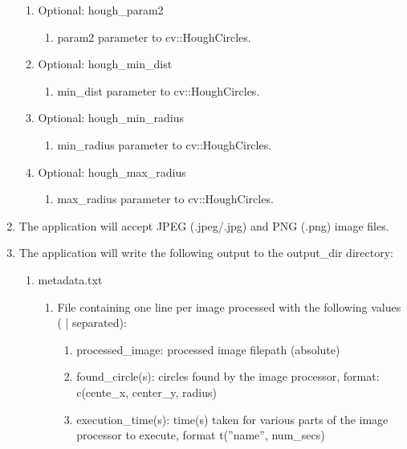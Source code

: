 \documentclass[10pt, onecolumn, draftclsnofoot, letterpaper, compsoc]{IEEEtran}
\begin{document}
\begin{enumerate}
\begin{enumerate}
            \item Optional: hough\_param2
		 		\begin{enumerate}
		 			\item param2 parameter to cv::HoughCircles.
		 		\end{enumerate}

            \item Optional: hough\_min\_dist
		 		\begin{enumerate}
		 			\item min\_dist parameter to cv::HoughCircles.
		 		\end{enumerate}

            \item Optional: hough\_min\_radius
		 		\begin{enumerate}
		 			\item min\_radius parameter to cv::HoughCircles.
		 		\end{enumerate}

            \item Optional: hough\_max\_radius
		 		\begin{enumerate}
		 			\item max\_radius parameter to cv::HoughCircles.
		 		\end{enumerate}
		 \end{enumerate}

		 \item The application will accept JPEG (.jpeg/.jpg) and PNG (.png)
		 image files.

		 \item The application will write the following output to the
		 output\_dir directory:
		 \begin{enumerate}
		 	\item metadata.txt
		 	\begin{enumerate}
		 		\item File containing one line per image processed with the
		 		following values ( |  separated):
		 		\begin{enumerate}
                    \item processed\_image: processed image filepath (absolute)

                    \item found\_circle(s): circles found by the image processor, format:
                        c(cente\_x, center\_y, radius)

                    \item execution\_time(s): time(s) taken for various parts of the image
                    processor to execute, format t(''name'', num\_secs)


\end{enumerate}
\end{enumerate}
\end{enumerate}
\end{enumerate}
\end{document}
